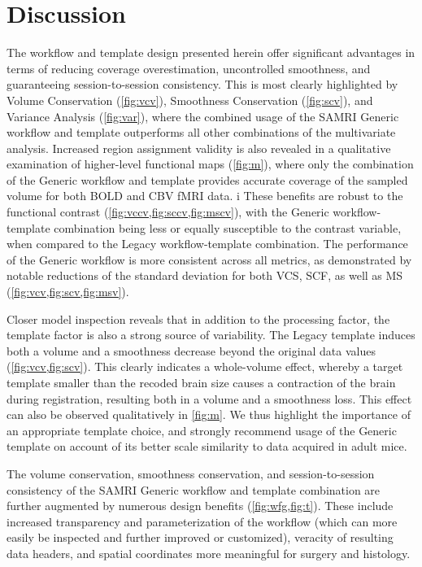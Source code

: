 \section{Discussion}

The workflow and template design presented herein offer significant advantages in terms of reducing coverage overestimation, uncontrolled smoothness, and guaranteeing session-to-session consistency.
This is most clearly highlighted by Volume Conservation (\cref{fig:vcv}), Smoothness Conservation (\cref{fig:scv}), and Variance Analysis (\cref{fig:var}), where the combined usage of the SAMRI Generic workflow and template outperforms all other combinations of the multivariate analysis.
Increased region assignment validity is also revealed in a qualitative examination of higher-level functional maps (\cref{fig:m}), where only the combination of the Generic workflow and template provides accurate coverage of the sampled volume for both BOLD and CBV fMRI data.
i%
These benefits are robust to the functional contrast (\cref{fig:vccv,fig:sccv,fig:mscv}), with the Generic workflow-template combination being less or equally susceptible to the contrast variable, when compared to the Legacy workflow-template combination.
The performance of the Generic workflow is more consistent across all metrics, as demonstrated by notable reductions of the standard deviation for both VCS, SCF, as well as MS (\cref{fig:vcv,fig:scv,fig:msv}).

Closer model inspection reveals that in addition to the processing factor, the template factor is also a strong source of variability.
The Legacy template induces both a volume and a smoothness decrease beyond the original data values (\cref{fig:vcv,fig:scv}).
This clearly indicates a whole-volume effect, whereby a target template smaller than the recoded brain size causes a contraction of the brain during registration, resulting both in a volume and a smoothness loss.
This effect can also be observed qualitatively in \cref{fig:m}.
We thus highlight the importance of an appropriate template choice, and strongly recommend usage of the Generic template on account of its better scale similarity to data acquired in adult mice.

The volume conservation, smoothness conservation, and session-to-session consistency of the SAMRI Generic workflow and template combination are further augmented by numerous design benefits (\cref{fig:wfg,fig:t}).
These include increased transparency and parameterization of the workflow (which can more easily be inspected and further improved or customized), veracity of resulting data headers, and spatial coordinates more meaningful for surgery and histology.

